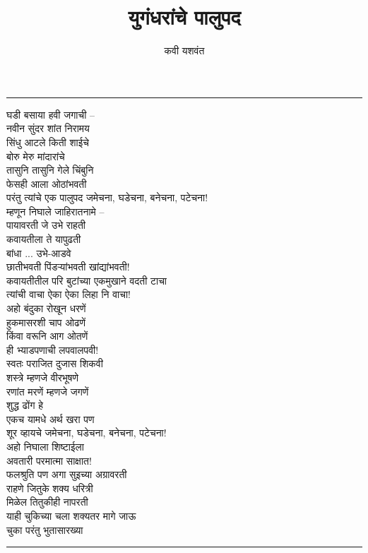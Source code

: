 \documentclass[17pt]{extarticle}  %
\begin{document}
\title{युगंधरांचे पालुपद}
\author{कवी यशवंत}


\date{}
\maketitle
\hrule
\vspace{5mm}

घडी बसाया हवी जगाची -- \\
नवीन सुंदर शांत निरामय\\
सिंधु आटले किती शाईचे\\
बोरु मेरु मांदारांचे\\
तासुनि तासुनि गेले चिंबुनि\\
फेसही आला ओठांभवती\\
परंतु त्यांचे एक पालुपद जमेचना, घडेचना, बनेचना, पटेचना!\\

म्हणून निघाले जाहिरातनामे --\\
पायावरती जे उभे राहती\\
कवायतीला ते यापुढती\\
बांधा ... उभे-आडवे\\
छातीभवती पिंडऱ्यांभवती खांद्यांभवती!\\
कवायतीतील परि बुटांच्या एकमुखाने वदती टाचा\\
त्यांची वाचा ऐका ऐका लिहा नि वाचा!\\
अहो बंदुका रोखून धरणें\\
हुकमासरशी चाप ओढणें\\
किंवा वरूनि आग ओतणें\\
ही भ्याडपणाची लपवालपवी!\\
स्वतः पराजित दुजास शिकवी\\
शस्त्रे म्हणजे वीरभूषणे\\
रणांत मरणें म्हणजे जगणें\\
शुद्ध ढोंग हे\\
एकच यामधे अर्थ खरा पण\\
शूर व्हायचे जमेचना, घडेचना, बनेचना, पटेचना!\\

अहो निघाला शिष्टाईला\\
अवतारी परमात्मा साक्षात!\\
फलश्रुति पण अगा सुइच्या अग्रावरती\\
राहणे जितुके शक्य धरित्री\\
मिळेल तितुकीही नापरती\\
याही चुकिच्या चला शक्यतर मागे जाऊ\\
चुका परंतु भुतासारख्या 

                       
\vspace{5mm}
\hrule
\end{document}
